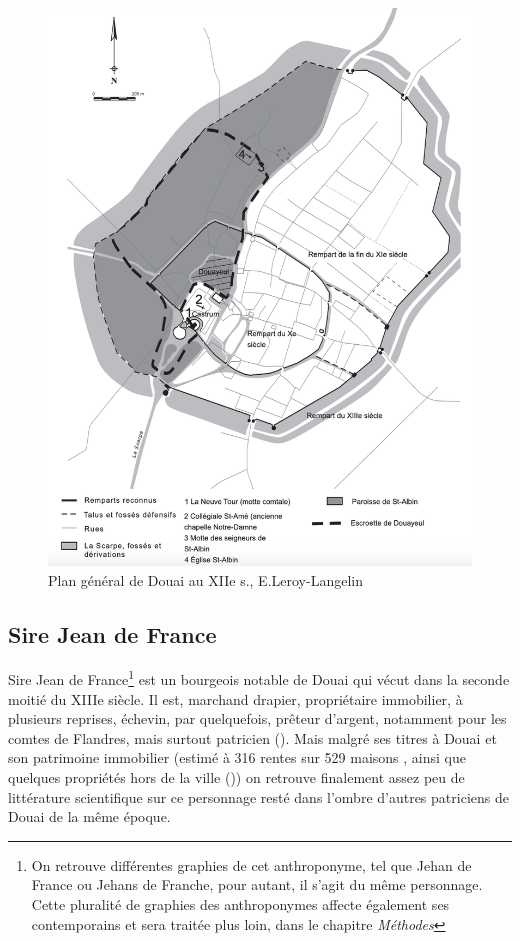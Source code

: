 \begin{figure}[ht] %
    \centering
    \includegraphics{1.Introduction/Img/Plan général de la ville de Douai avec les enceintes successives. DAO : E. Leroy-Langelin.png} 
    \caption{Plan général de Douai au XIIe s., E.Leroy-Langelin}
\end{figure}

\subsection{Sire Jean de France}
Sire Jean de France\footnote{On retrouve différentes graphies de cet anthroponyme, tel que \og Jehan de France\fg{} ou \og Jehans de Franche\fg{}, pour autant, il s'agit du même personnage. Cette pluralité de graphies des anthroponymes affecte également ses contemporains et sera traitée plus loin, dans le chapitre \textit{Méthodes}} est un bourgeois notable de Douai qui vécut dans la seconde moitié du XIIIe siècle. Il est, marchand drapier, propriétaire immobilier, à plusieurs reprises, échevin, par quelquefois, prêteur d'argent, notamment pour les comtes de Flandres, mais surtout patricien (\cite{espinas_les_1933}). 
Mais malgré ses titres à Douai et son patrimoine immobilier (estimé à 316 rentes sur 529 maisons , ainsi que quelques propriétés hors de la ville (\cite{blockmans_trois_1941})) on retrouve finalement assez peu de littérature scientifique sur ce personnage resté dans l'ombre d'autres patriciens de Douai de la même époque.

